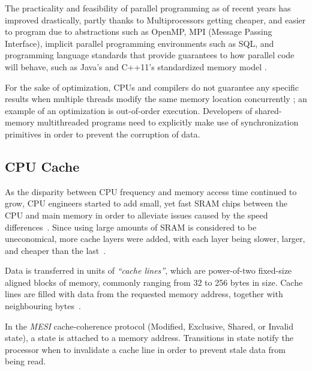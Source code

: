 The practicality and feasibility of parallel programming as of recent years has
improved drastically, partly thanks to Multiprocessors getting cheaper, and
easier to program due to abstractions such as OpenMP, MPI (Message Passing
Interface), implicit parallel programming environments such as SQL, and
programming language standards that provide guarantees to how parallel code will
behave, such as Java's\citep{javamemorymodel2014} and C++11's
\citep{cppmemorymodel} standardized memory model
\citep[Chapter~2.2]{perfbook2021}.

For the sake of optimization, CPUs and compilers do not guarantee any specific
results when multiple threads modify the same memory location concurrently
\citep{drepper2007every}; an example of an optimization is out-of-order
execution\citep[Appendix~B.7.1]{perfbook2021}. Developers of shared-memory
multithreaded programs need to explicitly make use of synchronization
primitives in order to prevent the corruption of data.

\subsection{CPU Cache}
As the disparity between CPU frequency and memory access time continued to
grow, CPU engineers started to add small, yet fast SRAM chips between the CPU
and main memory in order to alleviate issues caused by the speed
differences~\citep{cantrill2008real,drepper2007every,perfbook2021}. Since
using large amounts of SRAM is considered to be uneconomical, more cache layers
were added, with each layer being slower, larger, and cheaper than the
last~\citep{drepper2007every,perfbook2021}.

Data is transferred in units of \emph{``cache lines''}, which are power-of-two
fixed-size aligned blocks of memory, commonly ranging from 32 to 256 bytes in
size. Cache lines are filled with data from the requested memory address,
together with neighbouring bytes~\citep[Section~3.2.1]{perfbook2021}.


In the \emph{MESI} cache-coherence protocol (Modified, Exclusive, Shared,
or Invalid state), a state is attached to a memory address. Transitions in
state notify the processor when to invalidate a cache line in order to prevent
stale data from being read.

